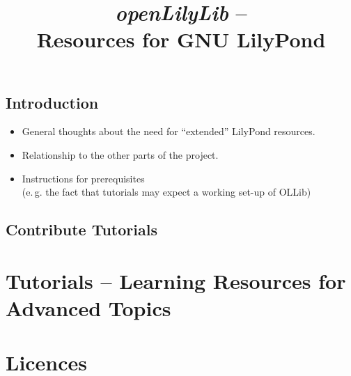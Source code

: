 \documentclass{OLLbook}
\begin{document}
\title{\textit{openLilyLib} -- \\
	Resources for GNU LilyPond}

\maketitle

\tableofcontents
\vfill
\pagebreak



\chapter{Introduction}

\begin{itemize}
\item General thoughts about the need for “extended” LilyPond resources.
\item Relationship to the other parts of the project.
\item Instructions for prerequisites\\
(e.\,g. the fact that tutorials may expect a working set-up of OLLib)
\end{itemize}

\chapter{Contribute Tutorials}



\part{Tutorials -- Learning Resources for Advanced Topics}

\part{Licences}

\end{document}
